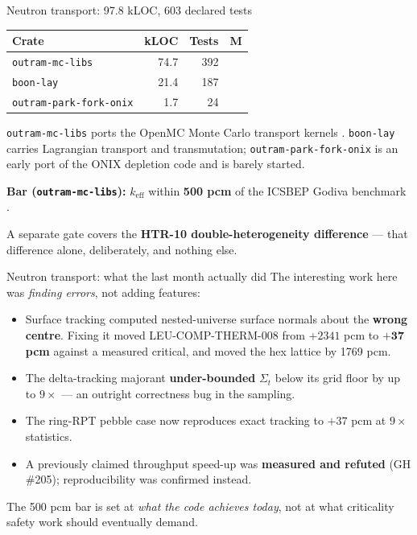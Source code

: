 \documentclass[aspectratio=169]{beamer}
\newcommand{\statustab}[1]{{\footnotesize\setlength{\tabcolsep}{4pt}#1}}
\begin{document}
\begin{frame}{Neutron transport: 97.8 kLOC, 603 declared tests}
    \statustab{
    \begin{tabular}{lrrc}
        \toprule
        \textbf{Crate} & \textbf{kLOC} & \textbf{Tests} & \textbf{M} \\
        \midrule
        \texttt{outram-mc-libs}         & 74.7 & 392 & \checkmark \\
        \texttt{boon-lay}               & 21.4 & 187 & \\
        \texttt{outram-park-fork-onix}  &  1.7 &  24 & \\
        \bottomrule
    \end{tabular}}

    \medskip
    \texttt{outram-mc-libs} ports the OpenMC Monte Carlo transport kernels
    \parencite{romano2015openmc}. \texttt{boon-lay} carries Lagrangian
    transport and transmutation; \texttt{outram-park-fork-onix} is an early
    port of the ONIX depletion code \parencite{lanversin2021onix} and is barely
    started.

    \medskip
    \textbf{Bar (\texttt{outram-mc-libs}):} $k_{\text{eff}}$ within
    \textbf{500 pcm} of the ICSBEP Godiva benchmark
    \parencite{icsbep2021}.

    \medskip
    A separate gate covers the \textbf{HTR-10 double-heterogeneity difference}
    \parencite{iaea2003htr10} --- that difference alone, deliberately, and
    nothing else.
\end{frame}

\begin{frame}{Neutron transport: what the last month actually did}
    The interesting work here was \emph{finding errors}, not adding features:

    \medskip
    \begin{itemize}
        \item Surface tracking computed nested-universe surface normals about
              the \textbf{wrong centre}. Fixing it moved LEU-COMP-THERM-008
              from $+2341$ pcm to $\mathbf{+37}$ \textbf{pcm} against a
              measured critical, and moved the hex lattice by 1769 pcm.
        \item The delta-tracking majorant \textbf{under-bounded} $\Sigma_t$
              below its grid floor by up to $9\times$ --- an outright
              correctness bug in the sampling.
        \item The ring-RPT pebble case now reproduces exact tracking to
              $+37$ pcm at $9\times$ statistics.
        \item A previously claimed throughput speed-up was \textbf{measured and
              refuted} (GH \#205); reproducibility was confirmed instead.
    \end{itemize}

    \medskip
    The 500 pcm bar is set at \emph{what the code achieves today}, not at what
    criticality safety work should eventually demand.
\end{frame}
\end{document}
